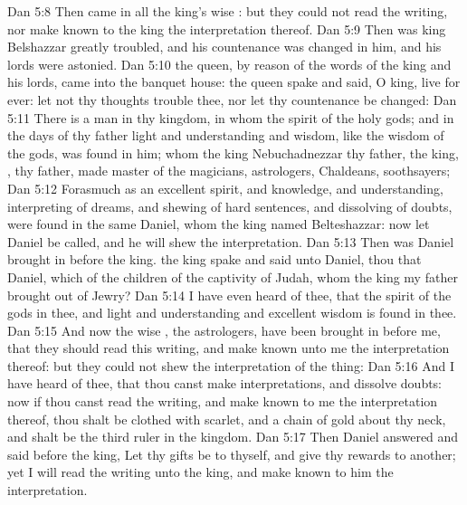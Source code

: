 \vs Dan 5:8 Then came in all the king's wise : but they could not read the writing, nor make known to the king the interpretation thereof.
\vs Dan 5:9 Then was king Belshazzar greatly troubled, and his countenance was changed in him, and his lords were astonied.
\vs Dan 5:10  the queen, by reason of the words of the king and his lords, came into the banquet house:  the queen spake and said, O king, live for ever: let not thy thoughts trouble thee, nor let thy countenance be changed:
\vs Dan 5:11 There is a man in thy kingdom, in whom  the spirit of the holy gods; and in the days of thy father light and understanding and wisdom, like the wisdom of the gods, was found in him; whom the king Nebuchadnezzar thy father, the king, , thy father, made master of the magicians, astrologers, Chaldeans,  soothsayers;
\vs Dan 5:12 Forasmuch as an excellent spirit, and knowledge, and understanding, interpreting of dreams, and shewing of hard sentences, and dissolving of doubts, were found in the same Daniel, whom the king named Belteshazzar: now let Daniel be called, and he will shew the interpretation.
\vs Dan 5:13 Then was Daniel brought in before the king.  the king spake and said unto Daniel,  thou that Daniel, which  of the children of the captivity of Judah, whom the king my father brought out of Jewry?
\vs Dan 5:14 I have even heard of thee, that the spirit of the gods  in thee, and  light and understanding and excellent wisdom is found in thee.
\vs Dan 5:15 And now the wise , the astrologers, have been brought in before me, that they should read this writing, and make known unto me the interpretation thereof: but they could not shew the interpretation of the thing:
\vs Dan 5:16 And I have heard of thee, that thou canst make interpretations, and dissolve doubts: now if thou canst read the writing, and make known to me the interpretation thereof, thou shalt be clothed with scarlet, and  a chain of gold about thy neck, and shalt be the third ruler in the kingdom.
\vs Dan 5:17 Then Daniel answered and said before the king, Let thy gifts be to thyself, and give thy rewards to another; yet I will read the writing unto the king, and make known to him the interpretation.
